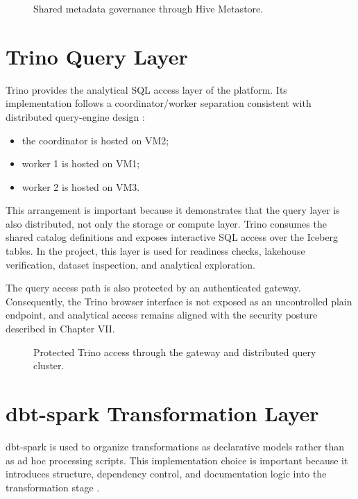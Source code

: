 \begin{figure}[H]
    \centering
    
    \caption{Shared metadata governance through Hive Metastore.}
    \label{fig:chapter5-metadata-governance}
\end{figure}

\section{Trino Query Layer}
Trino provides the analytical SQL access layer of the platform. Its implementation follows a coordinator/worker separation consistent with distributed query-engine design \cite{trino_docs}:
\begin{itemize}
    \item the coordinator is hosted on VM2;
    \item worker 1 is hosted on VM1;
    \item worker 2 is hosted on VM3.
\end{itemize}

This arrangement is important because it demonstrates that the query layer is also distributed, not only the storage or compute layer. Trino consumes the shared catalog definitions and exposes interactive SQL access over the Iceberg tables. In the project, this layer is used for readiness checks, lakehouse verification, dataset inspection, and analytical exploration.

The query access path is also protected by an authenticated gateway. Consequently, the Trino browser interface is not exposed as an uncontrolled plain endpoint, and analytical access remains aligned with the security posture described in Chapter VII.

\begin{figure}[H]
    \centering
    
    \caption{Protected Trino access through the gateway and distributed query cluster.}
    \label{fig:chapter5-trino-access}
\end{figure}

\section{dbt-spark Transformation Layer}
dbt-spark is used to organize transformations as declarative models rather than as ad hoc processing scripts. This implementation choice is important because it introduces structure, dependency control, and documentation logic into the transformation stage \cite{dbt_docs}.

